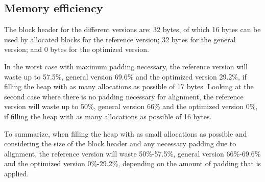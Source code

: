 
\subsection{Memory efficiency}

The block header for the different versions are: 32 bytes, of which 16 bytes can be used by allocated blocks for the reference version; 32 bytes for the general version; and 0 bytes for the optimized version. 

In the worst case with maximum padding necessary, the reference version will waste up to 57.5\%, general version 69.6\% and the optimized version 29.2\%, if filling the heap with as many allocations as possible of 17 bytes. Looking at the second case where there is no padding necessary for alignment, the reference version will waste up to 50\%, general version 66\% and the optimized version 0\%, if filling the heap with as many allocations as possible of 16 bytes.

To summarize, when filling the heap with as small allocations as possible and considering the size of the block header and any necessary padding due to alignment, the reference version will waste 50\%-57.5\%, general version 66\%-69.6\% and the optimized version 0\%-29.2\%, depending on the amount of padding that is applied.








